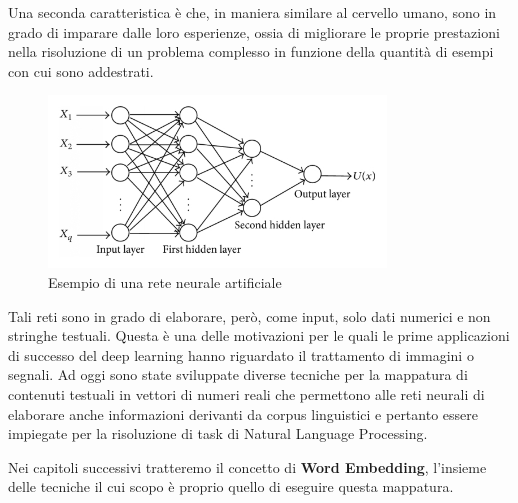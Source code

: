 Una seconda caratteristica è che, in maniera similare al cervello umano, sono in grado di imparare dalle loro esperienze, ossia di migliorare le proprie prestazioni nella risoluzione di un problema complesso in funzione della quantità di esempi con cui sono addestrati.
\begin{figure}[hbt!]
    \centering
    \includegraphics[width=0.8\textwidth]{img/ann.jpg}
    \caption{Esempio di una rete neurale artificiale}
    \label{fig:ann}
\end{figure}
\newpage
Tali reti sono in grado di elaborare, però, come input, solo dati numerici e non stringhe testuali. Questa è una delle motivazioni per le quali le prime applicazioni di successo del deep learning hanno riguardato il trattamento di immagini o segnali. Ad oggi sono state sviluppate diverse tecniche per la mappatura di contenuti testuali in vettori di numeri reali che permettono alle reti neurali di elaborare anche informazioni derivanti da corpus linguistici e pertanto essere impiegate per la risoluzione di task di Natural Language Processing.

Nei capitoli successivi tratteremo il concetto di \textbf{Word Embedding}, l'insieme delle tecniche il cui scopo è proprio quello di eseguire questa mappatura.